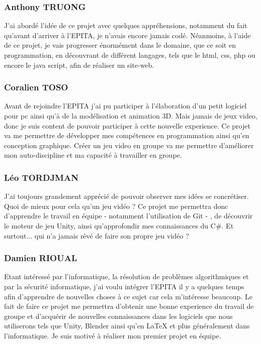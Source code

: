 \documentclass[A4paper,11pt]{article}
\begin{document}
\subsubsection{Anthony TRUONG}
J'ai abord\'e l'id\'ee de ce projet avec quelques appr\'ehensions, notamment du fait qu'avant d'arriver \`a l'EPITA, je n'avais encore jamais cod\'e. N\'eanmoins, \`a l'aide de ce projet, je vais progresser \'enorm\'ement dans le domaine, que ce soit en programmation, en d\'ecouvrant de diff\'erent langages, tels que le html, css, php ou encore le java script, afin de r\'ealiser un site-web.

\subsubsection{Coralien TOSO}
Avant de rejoindre l'EPITA j'ai pu participer \`a l'\'elaboration d'un petit logiciel pour pc ainsi qu'\`a de la mod\'elisation et animation 3D. Mais jamais de jeux video, donc je suis content de pouvoir participer \`a cette nouvelle experience. Ce projet va me permettre de d\'evelopper mes comp\'etences en programmation ainsi qu'en conception graphique. Cr\'eer un jeu video en groupe va me permettre d'am\'eliorer mon auto-discipline et ma capacit\'e \`a travailler en groupe.
\newpage

\subsubsection{L\'eo TORDJMAN}
J'ai toujours grandement appr\'eci\'e de pouvoir observer mes id\'ees se concr\'etiser. Quoi de mieux pour cela qu'un jeu vid\'eo ? Ce projet me permettra donc d'apprendre le travail en \'equipe - notamment l'utilisation de Git - , de d\'ecouvrir le moteur de jeu Unity, ainsi qu'approfondir mes connaissances du C\#. Et surtout... qui n'a jamais r\^ev\'e de faire son propre jeu vid\'eo ?
\subsubsection{Damien RIOUAL}
Etant int\'eress\'e par l'informatique, la r\'esolution de probl\`emes algorithmiques et par la s\'ecurit\'e informatique, j'ai voulu int\'egrer l'EPITA il y a quelques temps afin d'apprendre de nouvelles choses \`a ce sujet car cela m'int\'eresse beaucoup. Le fait de faire ce projet me permettra d'obtenir une bonne experience du travail de groupe et d'acqu\'erir de nouvelles connaissances dans les logiciels que nous utiliserons tels que Unity, Blender ainsi qu'en LaTeX et plus g\'en\'eralement dans l'informatique. Je suis motiv\'e \`a r\'ealiser mon premier projet en \'equipe.
\end{document}
